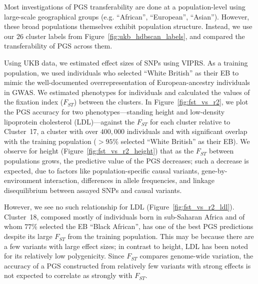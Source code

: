 Most investigations of PGS transferability are done at a population-level using large-scale geographical groups (e.g. ``African'', ``European'', ``Asian''). However, these broad populations themselves exhibit population structure\citep{kamiza_transferability_2022}. Instead, we use our $26$ cluster labels from Figure~\ref{fig:ukb_hdbscan_labels}, and compared the transferability of PGS across them. 

Using UKB data, we estimated effect sizes of SNPs using VIPRS\citep{zabad_fast_2023}. As a training population, we used individuals who selected ``White British'' as their EB to mimic the well-documented overrepresentation of European-ancestry individuals in GWAS. We estimated phenotypes for individuals and calculated the values of the fixation index ($F_{ST}$) between the clusters. In Figure~\ref{fig:fst_vs_r2}, we plot the PGS accuracy for two phenotypes---standing height and low-density lipoprotein cholesterol (LDL)---against the $F_{ST}$ for each cluster relative to Cluster~17, a cluster with over $400,000$ individuals and with significant overlap with the training population ($>95\%$ selected ``White British'' as their EB). We observe for height (Figure~\ref{fig:fst_vs_r2_height}) that as the $F_{ST}$ between populations grows, the predictive value of the PGS decreases; such a decrease is expected, due to factors like population-specific causal variants, gene-by-environment interaction, differences in allele frequencies, and linkage disequilibrium between assayed SNPs and causal variants\citep{wang_theoretical_2020}.

However, we see no such relationship for LDL (Figure~\ref{fig:fst_vs_r2_ldl}). Cluster~18, composed mostly of individuals born in sub-Saharan Africa and of whom $77\%$ selected the EB ``Black African'', has one of the best PGS predictions despite its large $F_{ST}$ from the training population. This may be because there are a few variants with large effect sizes; in contrast to height, LDL has been noted for its relatively low polygenicity\citep{ding_polygenic_2023}. Since $F_{ST}$ compares genome-wide variation, the accuracy of a PGS constructed from relatively few variants with strong effects is not expected to correlate as strongly with $F_{ST}$.

